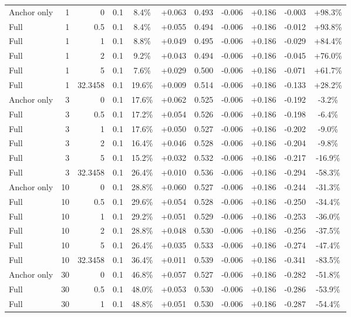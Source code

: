 \begin{table}[htbp]
\begin{tabular}{lrrrccccccc}
Anchor only & 1 & 0 & 0.1 & 8.4\% & +0.063 & 0.493 & -0.006 & +0.186 & -0.003 & +98.3\% \\
Full & 1 & 0.5 & 0.1 & 8.4\% & +0.055 & 0.494 & -0.006 & +0.186 & -0.012 & +93.8\% \\
Full & 1 & 1 & 0.1 & 8.8\% & +0.049 & 0.495 & -0.006 & +0.186 & -0.029 & +84.4\% \\
Full & 1 & 2 & 0.1 & 9.2\% & +0.043 & 0.494 & -0.006 & +0.186 & -0.045 & +76.0\% \\
Full & 1 & 5 & 0.1 & 7.6\% & +0.029 & 0.500 & -0.006 & +0.186 & -0.071 & +61.7\% \\
Full & 1 & 32.3458 & 0.1 & 19.6\% & +0.009 & 0.514 & -0.006 & +0.186 & -0.133 & +28.2\% \\
Anchor only & 3 & 0 & 0.1 & 17.6\% & +0.062 & 0.525 & -0.006 & +0.186 & -0.192 & -3.2\% \\
Full & 3 & 0.5 & 0.1 & 17.2\% & +0.054 & 0.526 & -0.006 & +0.186 & -0.198 & -6.4\% \\
Full & 3 & 1 & 0.1 & 17.6\% & +0.050 & 0.527 & -0.006 & +0.186 & -0.202 & -9.0\% \\
Full & 3 & 2 & 0.1 & 16.4\% & +0.046 & 0.528 & -0.006 & +0.186 & -0.204 & -9.8\% \\
Full & 3 & 5 & 0.1 & 15.2\% & +0.032 & 0.532 & -0.006 & +0.186 & -0.217 & -16.9\% \\
Full & 3 & 32.3458 & 0.1 & 26.4\% & +0.010 & 0.536 & -0.006 & +0.186 & -0.294 & -58.3\% \\
Anchor only & 10 & 0 & 0.1 & 28.8\% & +0.060 & 0.527 & -0.006 & +0.186 & -0.244 & -31.3\% \\
Full & 10 & 0.5 & 0.1 & 29.6\% & +0.054 & 0.528 & -0.006 & +0.186 & -0.250 & -34.4\% \\
Full & 10 & 1 & 0.1 & 29.2\% & +0.051 & 0.529 & -0.006 & +0.186 & -0.253 & -36.0\% \\
Full & 10 & 2 & 0.1 & 28.8\% & +0.048 & 0.530 & -0.006 & +0.186 & -0.256 & -37.5\% \\
Full & 10 & 5 & 0.1 & 26.4\% & +0.035 & 0.533 & -0.006 & +0.186 & -0.274 & -47.4\% \\
Full & 10 & 32.3458 & 0.1 & 36.4\% & +0.011 & 0.539 & -0.006 & +0.186 & -0.341 & -83.5\% \\
Anchor only & 30 & 0 & 0.1 & 46.8\% & +0.057 & 0.527 & -0.006 & +0.186 & -0.282 & -51.8\% \\
Full & 30 & 0.5 & 0.1 & 48.0\% & +0.053 & 0.530 & -0.006 & +0.186 & -0.286 & -53.9\% \\
Full & 30 & 1 & 0.1 & 48.8\% & +0.051 & 0.530 & -0.006 & +0.186 & -0.287 & -54.4\% \\

\end{tabular}
\end{table}
